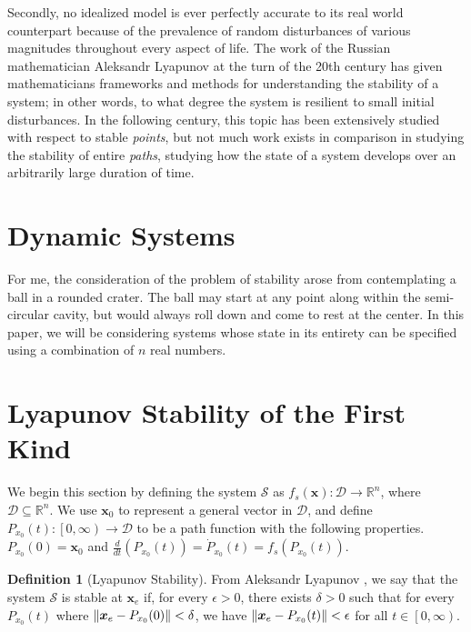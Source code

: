 \documentclass{article}
\newcommand{\B}[1]{\boldsymbol{#1}}
\DeclarePairedDelimiter\norm{\lVert}{\rVert}%
\theoremstyle{definition}
\newtheorem{definition}{Definition}[section]
\theoremstyle{remark}
\begin{document}
Secondly, no idealized model is ever perfectly accurate to its real world counterpart
because of the prevalence of random disturbances of various magnitudes throughout
every aspect of life. The work of the Russian mathematician
Aleksandr Lyapunov \cite{Lyapunov:1992} at the turn of the 20th century has given mathematicians 
frameworks and methods for understanding the stability of a system; 
in other words, to what degree the system is  
resilient to small initial disturbances. In the following century, this
topic has been extensively studied with respect to stable \textit{points},
but not much work exists in comparison in studying the
stability of entire \textit{paths}, studying how the state of a system
develops over an arbitrarily large duration of time.


\section{Dynamic Systems}

For me, the consideration of the problem of stability arose from
contemplating a ball in a rounded crater. The ball may start at any
point along within the semi-circular cavity, but would always roll
down and come to rest at the center.  
In this paper, we will be considering systems whose state in its entirety 
can be specified using a combination of $n$ real numbers. 

\section{Lyapunov Stability of the First Kind}



We begin this section by defining the system $\mathcal{S}$ as $f_s(\B{x}) : \mathcal{D} \to \mathbb{R}^n$, where
$\mathcal{D} \subseteq \mathbb{R}^n$. We use $\B{x}_0$ to represent a general vector in $\mathcal{D}$, and define 
$P_{x_0}(t) : \left[0, \infty \right) \to \mathcal{D}$ to be a path function with the following properties.
$P_{x_0}(0) = \B{x}_0$ and $\frac{d}{dt} \left(P_{x_0}(t)\right)  = \dot{P}_{x_0}(t) = f_s(P_{x_0}(t)).$

\begin{definition}[Lyapunov Stability]
  \label{Lyapunov Stability}
  From Aleksandr Lyapunov \cite{Lyapunov:1992}, we say that the system $\mathcal{S}$ is stable at
  $\B{x}_e$ if, for every $\epsilon > 0$, there exists $\delta > 0$
  such that for every $P_{x_0}(t)$ where $\norm{\B{x}_e - P_{x_0}(0)} < \delta $,
  we have $\norm{\B{x}_e - P_{x_0}(t)} < \epsilon$
  for all $t \in \left[0, \infty \right)$.
\end{definition}
\end{document}
